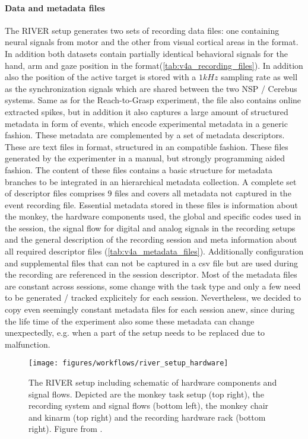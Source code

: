 \paragraph{Data and metadata files}
The RIVER setup generates two sets of  recording data files: one containing neural signals from motor and the other from visual cortical areas in the  format. In addition both datasets contain partially identical behavioral signals for the hand, arm and gaze position in the  format(\cref{tab:v4a_recording_files}). In addition also the position of the active target is stored with a $1kHz$ sampling rate as well as the synchronization signals which are shared between the two NSP / Cerebus systems.
Same as for the Reach-to-Grasp experiment, the  file also contains online extracted spikes, but in addition it also captures a large amount of structured metadata in form of events, which encode experimental metadata in a generic fashion.
These metadata are complemented by a set of metadata descriptors. These are text files in  format, structured in an  compatible fashion. These files generated by the experimenter in a manual, but strongly programming aided fashion. The content of these files contains a basic structure for metadata branches to be integrated in an hierarchical  metadata collection. A complete set of descriptor files comprises $9$  files and covers all metadata not captured in the event recording file. Essential metadata stored in these  files is information about the monkey, the hardware components used, the global and specific codes used in the session, the signal flow for digital and analog signals in the recording setups and the general description of the recording session and meta information about all required descriptor files (\cref{tab:v4a_metadata_files}). Additionally configuration and supplemental files that can not be captured in a csv file but are used during the recording are referenced in the session descriptor. Most of the metadata files are constant across sessions, some change with the task type and only a few need to be generated / tracked explicitely for each session. Nevertheless, we decided to copy even seemingly constant metadata files for each session anew, since during the life time of the experiment also some these metadata can change unexpectedly, e.g. when a part of the setup needs to be replaced due to malfunction.




\begin{sidewaysfigure}
 \texttt{[image: figures/workflows/river\_setup\_hardware]}
 \caption[The RIVER setup]{The RIVER setup including schematic of hardware components and signal flows. Depicted are the monkey task setup (top right), the recording system and signal flows (bottom left), the monkey chair and kinarm (top right) and the recording hardware rack (bottom right). Figure from \citet{deHaan_2018a}.}
 \label{fig:river_setup}
\end{sidewaysfigure}


